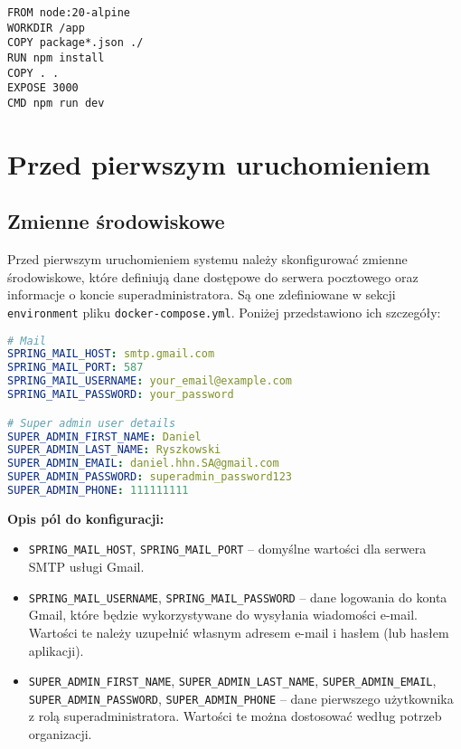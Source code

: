 \begin{lstlisting}[language=docker, caption=Dockerfile frontendu]
FROM node:20-alpine
WORKDIR /app
COPY package*.json ./
RUN npm install
COPY . .
EXPOSE 3000
CMD npm run dev
\end{lstlisting}


\section{Przed pierwszym uruchomieniem}
\subsection{Zmienne środowiskowe}
Przed pierwszym uruchomieniem systemu należy skonfigurować zmienne środowiskowe, które definiują dane dostępowe do serwera pocztowego oraz informacje o koncie superadministratora. Są one zdefiniowane w sekcji \texttt{environment} pliku \texttt{docker-compose.yml}. Poniżej przedstawiono ich szczegóły:

\begin{lstlisting}[language=yaml, caption=Konfiguracja zmiennych środowiskowych]
# Mail
SPRING_MAIL_HOST: smtp.gmail.com
SPRING_MAIL_PORT: 587
SPRING_MAIL_USERNAME: your_email@example.com
SPRING_MAIL_PASSWORD: your_password

# Super admin user details
SUPER_ADMIN_FIRST_NAME: Daniel
SUPER_ADMIN_LAST_NAME: Ryszkowski
SUPER_ADMIN_EMAIL: daniel.hhn.SA@gmail.com
SUPER_ADMIN_PASSWORD: superadmin_password123
SUPER_ADMIN_PHONE: 111111111
\end{lstlisting}

\textbf{Opis pól do konfiguracji:}
\begin{itemize}
    \item \texttt{SPRING\_MAIL\_HOST}, \texttt{SPRING\_MAIL\_PORT} -- domyślne wartości dla serwera SMTP usługi Gmail.
    \item \texttt{SPRING\_MAIL\_USERNAME}, \texttt{SPRING\_MAIL\_PASSWORD} -- dane logowania do konta Gmail, które będzie wykorzystywane do wysyłania wiadomości e-mail. Wartości te należy uzupełnić własnym adresem e-mail i hasłem (lub hasłem aplikacji).
    \item \texttt{SUPER\_ADMIN\_FIRST\_NAME}, \texttt{SUPER\_ADMIN\_LAST\_NAME}, \texttt{SUPER\_ADMIN\_EMAIL}, \texttt{SUPER\_ADMIN\_PASSWORD}, \texttt{SUPER\_ADMIN\_PHONE} -- dane pierwszego użytkownika z rolą superadministratora. Wartości te można dostosować według potrzeb organizacji.
\end{itemize}


